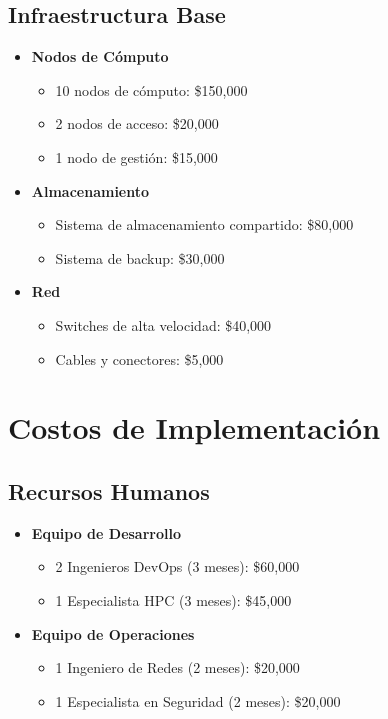 \subsection{Infraestructura Base}
\begin{itemize}
    \item \textbf{Nodos de Cómputo}
    \begin{itemize}
        \item 10 nodos de cómputo: \$150,000
        \item 2 nodos de acceso: \$20,000
        \item 1 nodo de gestión: \$15,000
    \end{itemize}
    \item \textbf{Almacenamiento}
    \begin{itemize}
        \item Sistema de almacenamiento compartido: \$80,000
        \item Sistema de backup: \$30,000
    \end{itemize}
    \item \textbf{Red}
    \begin{itemize}
        \item Switches de alta velocidad: \$40,000
        \item Cables y conectores: \$5,000
    \end{itemize}
\end{itemize}

\section{Costos de Implementación}
\subsection{Recursos Humanos}
\begin{itemize}
    \item \textbf{Equipo de Desarrollo}
    \begin{itemize}
        \item 2 Ingenieros DevOps (3 meses): \$60,000
        \item 1 Especialista HPC (3 meses): \$45,000
    \end{itemize}
    \item \textbf{Equipo de Operaciones}
    \begin{itemize}
        \item 1 Ingeniero de Redes (2 meses): \$20,000
        \item 1 Especialista en Seguridad (2 meses): \$20,000
    \end{itemize}
\end{itemize}

